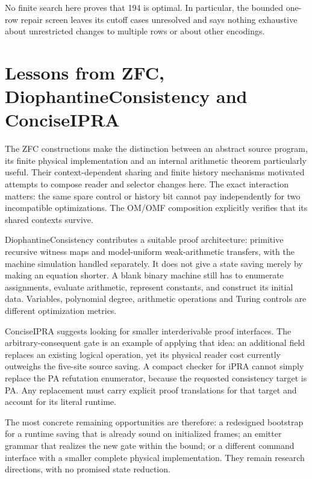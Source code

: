 \documentclass[11pt,a4paper]{article}
\begin{document}
No finite search here proves that 194 is optimal. In particular, the
bounded one-row repair screen leaves its cutoff cases unresolved and says
nothing exhaustive about unrestricted changes to multiple rows or about
other encodings.



\section{Lessons from ZFC, DiophantineConsistency and ConciseIPRA}

The ZFC constructions make the distinction between an abstract source
program, its finite physical implementation and an internal arithmetic
theorem particularly useful. Their context-dependent sharing and finite
history mechanisms motivated attempts to compose reader and selector
changes here. The exact interaction matters: the same spare control or
history bit cannot pay independently for two incompatible optimizations.
The OM/OMF composition explicitly verifies that its shared contexts survive.

DiophantineConsistency contributes a suitable proof architecture:
primitive recursive witness maps and model-uniform weak-arithmetic
transfers, with the machine simulation handled separately. It does not
give a state saving merely by making an equation shorter. A blank binary
machine still has to enumerate assignments, evaluate arithmetic, represent
constants, and construct its initial data. Variables, polynomial degree,
arithmetic operations and Turing controls are different optimization
metrics.

ConciseIPRA suggests looking for smaller interderivable proof interfaces.
The arbitrary-consequent gate is an example of applying that idea: an
additional field replaces an existing logical operation, yet its physical
reader cost currently outweighs the five-site source saving. A compact
checker for iPRA cannot simply replace the PA refutation enumerator, because
the requested consistency target is PA. Any replacement must carry explicit
proof translations for that target and account for its literal runtime.

The most concrete remaining opportunities are therefore: a redesigned
bootstrap for a runtime saving that is already sound on initialized frames;
an emitter grammar that realizes the new gate within the bound; or a
different command interface with a smaller complete physical implementation.
They remain research directions, with no promised state reduction.
\end{document}
